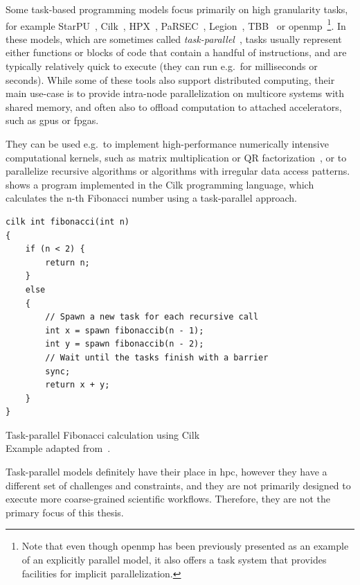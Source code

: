 Some task-based programming models focus primarily on high granularity tasks, for example
StarPU~\cite{starpu}, Cilk~\cite{cilk}, HPX~\cite{hpx},
PaRSEC~\cite{parsec}, Legion~\cite{legion}, TBB~\cite{tbb} or
\gls{openmp}~\cite{openmp}\footnote{Note that even though \gls{openmp} has been previously presented as an example of an
explicitly parallel model, it also offers a task system that provides facilities for implicit parallelization.}. In these models, which are
sometimes called \emph{task-parallel}~\cite{task_based_taxonomy}, tasks usually represent either
functions or blocks of code that contain a handful of instructions, and are typically relatively
quick to execute (they can run e.g.\ for milliseconds or seconds). While some of these tools also
support distributed computing, their main use-case is to provide intra-node parallelization on
multicore systems with shared memory, and often also to offload computation to attached
accelerators, such as \glspl{gpu} or \glspl{fpga}.

They can be used e.g.\ to implement high-performance numerically intensive computational kernels,
such as matrix multiplication or QR factorization~\cite{qr_factorization}, or to parallelize
recursive algorithms or algorithms with irregular data access patterns. 
shows a program implemented in the Cilk programming language, which calculates the n-th Fibonacci
number using a task-parallel approach.

\begin{listing}
	\begin{verbatim}
cilk int fibonacci(int n)
{
	if (n < 2) {
		return n;
	}
	else
	{
		// Spawn a new task for each recursive call
		int x = spawn fibonaccib(n - 1);
		int y = spawn fibonaccib(n - 2);
		// Wait until the tasks finish with a barrier
		sync;
		return x + y;
	}
}
	\end{verbatim}
	\caption{Task-parallel Fibonacci calculation using Cilk\\Example adapted from~\cite{cilk}.}
	\label{lst:cilk-fibonacci}
\end{listing}

Task-parallel models definitely have their place in \gls{hpc}, however they have a
different set of challenges and constraints, and they are not primarily designed to execute more
coarse-grained scientific workflows. Therefore, they are not the primary focus of this thesis.

